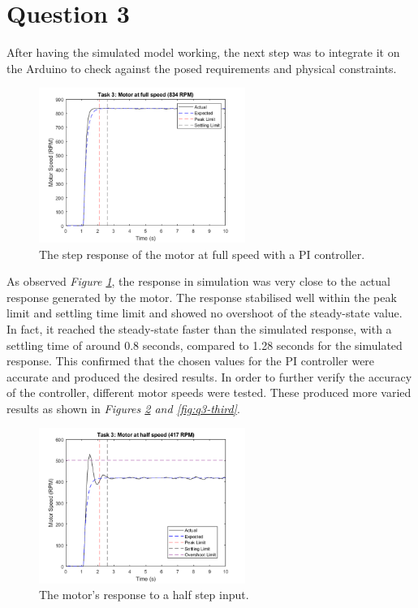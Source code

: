 \documentclass[11pt, onecolumn]{article}
\begin{document}
\section*{Question 3}
\par After having the simulated model working, the next step was to integrate it on the Arduino to check against the posed requirements and physical constraints.
\begin{figure}[h!]
    \centering
    \includegraphics[width=0.6\textwidth]{q3-g1.png}
    \caption{The step response of the motor at full speed with a PI controller.}
    \label{fig:q3-first}
\end{figure}
\par As observed \textit{Figure \ref{fig:q3-first}}, the response in simulation was very close to the actual response generated by the motor. The response stabilised well within the peak limit and settling time limit and showed no overshoot of the steady-state value. In fact, it reached the steady-state faster than the simulated response, with a settling time of around 0.8 seconds, compared to 1.28 seconds for the simulated response. This confirmed that the chosen values for the PI controller were accurate and produced the desired results. In order to further verify the accuracy of the controller, different motor speeds were tested. These produced more varied results as shown in \textit{Figures \ref{fig:q3-second} and \ref{fig:q3-third}}.
\begin{figure}[h!]
    \centering
    \includegraphics[width=0.6\textwidth]{q3-g2.png}
    \caption{The motor's response to a half step input.}
    \label{fig:q3-second}
\end{figure}
\end{document}
